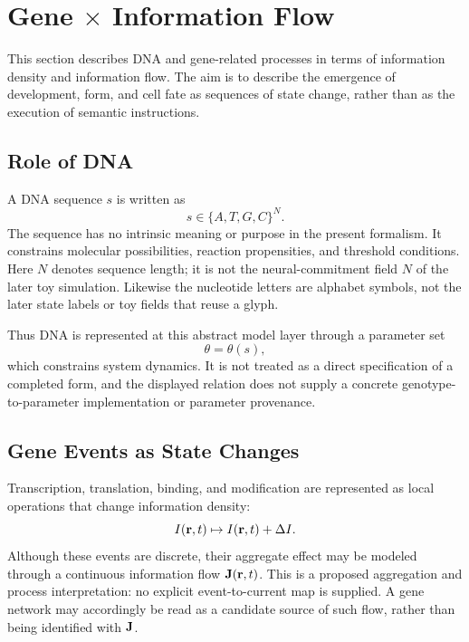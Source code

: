 \section{Gene \texorpdfstring{\(\times\)}{x} Information Flow}

This section describes DNA and gene-related processes in terms of information density and information flow. The aim is to describe the emergence of development, form, and cell fate as sequences of state change, rather than as the execution of semantic instructions.

\subsection{Role of DNA}

A DNA sequence \(s\) is written as
\begin{equation}
  s \in \{A,T,G,C\}^{N}.
\end{equation}
The sequence has no intrinsic meaning or purpose in the present formalism. It constrains molecular possibilities, reaction propensities, and threshold conditions.
Here \(N\) denotes sequence length; it is not the neural-commitment field \(N\) of the later toy simulation. Likewise the nucleotide letters are alphabet symbols, not the later state labels or toy fields that reuse a glyph.

Thus DNA is represented at this abstract model layer through a parameter set
\begin{equation}
  \theta = \theta(s),
\end{equation}
which constrains system dynamics. It is not treated as a direct specification of a completed form, and the displayed relation does not supply a concrete genotype-to-parameter implementation or parameter provenance.

\subsection{Gene Events as State Changes}

Transcription, translation, binding, and modification are represented as local operations that change information density:
\begin{equation}
  I(\mathbf{r},t) \mapsto I(\mathbf{r},t) + \Delta I.
\end{equation}
Although these events are discrete, their aggregate effect may be modeled through a continuous information flow \(\mathbf{J}(\mathbf{r},t)\). This is a proposed aggregation and process interpretation: no explicit event-to-current map is supplied. A gene network may accordingly be read as a candidate source of such flow, rather than being identified with \(\mathbf{J}\).


